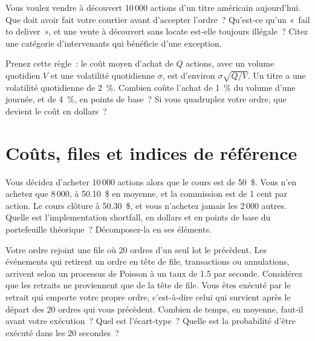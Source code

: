\begin{question}\label{iq:iv2:markets-and-microstructure:14}
Vous voulez vendre à découvert 10\,000 actions d'un titre américain aujourd'hui. Que doit avoir fait votre courtier avant d'accepter l'ordre~? Qu'est-ce qu'un «~fail to deliver~», et une vente à découvert sans locate est-elle toujours illégale~? Citez une catégorie d'intervenants qui bénéficie d'une exception.
\end{question}

\begin{question}\label{iq:iv2:markets-and-microstructure:15}
Prenez cette règle~: le coût moyen d'achat de $Q$ actions, avec un volume quotidien $V$ et une volatilité quotidienne $\sigma$, est d'environ $\sigma\sqrt{Q/V}$. Un titre a une volatilité quotidienne de 2~\%. Combien coûte l'achat de 1~\% du volume d'une journée, et de 4~\%, en points de base~? Si vous quadruplez votre ordre, que devient le coût en dollars~?
\end{question}

\section{Coûts, files et indices de référence}

\begin{question}\label{iq:iv2:markets-and-microstructure:16}
Vous décidez d'acheter 10\,000 actions alors que le cours est de 50~\$. Vous n'en achetez que 8\,000, à 50.10~\$ en moyenne, et la commission est de 1 cent par action. Le cours clôture à 50.30~\$, et vous n'achetez jamais les 2\,000 autres. Quelle est l'implementation shortfall, en dollars et en points de base du portefeuille théorique~? Décomposez-la en ses éléments.
\end{question}

\begin{question}\label{iq:iv2:markets-and-microstructure:17}
Votre ordre rejoint une file où 20 ordres d'un seul lot le précèdent. Les événements qui retirent un ordre en tête de file, transactions ou annulations, arrivent selon un processus de Poisson à un taux de 1.5 par seconde. Considérez que les retraits ne proviennent que de la tête de file. Vous êtes exécuté par le retrait qui emporte votre propre ordre, c'est-à-dire celui qui survient après le départ des 20 ordres qui vous précèdent. Combien de temps, en moyenne, faut-il avant votre exécution~? Quel est l'écart-type~? Quelle est la probabilité d'être exécuté dans les 20 secondes~?
\end{question}


